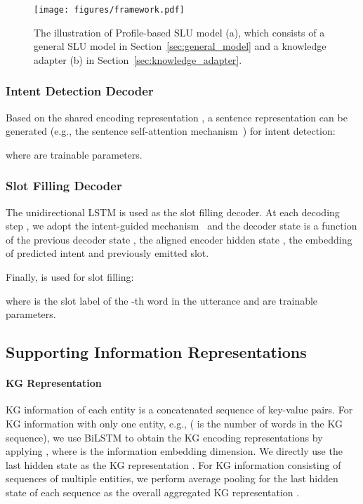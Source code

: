 \documentclass[letterpaper]{article} \usepackage{aaai22}  \usepackage{times}  \usepackage{helvet}  \usepackage{courier}  \usepackage[hyphens]{url}  \usepackage{graphicx} \urlstyle{rm} \def\UrlFont{\rm}  \usepackage{natbib}  \usepackage{caption} \DeclareCaptionStyle{ruled}{labelfont=normalfont,labelsep=colon,strut=off} \frenchspacing  \setlength{\pdfpagewidth}{8.5in}  \setlength{\pdfpageheight}{11in}  \usepackage{algorithm}
\begin{document}
\begin{figure}[t]
	\centering
	\texttt{[image: figures/framework.pdf]}
	\caption{
		The illustration of Profile-based SLU model (a), which consists of a general SLU model in Section~\ref{sec:general_model} and a knowledge adapter (b) in Section~\ref{sec:knowledge_adapter}.
    }
	\label{fig:framework}
\end{figure}

\subsubsection{Intent Detection Decoder}
Based on the shared encoding representation , 
a sentence representation  can be generated (e.g., the sentence self-attention mechanism~\citep{zhong-etal-2018-global}) for intent detection:

where  are trainable parameters. 

\subsubsection{Slot Filling Decoder}
The unidirectional LSTM is used as the slot filling decoder. 
At each decoding step , we adopt the intent-guided mechanism~\citep{qin-etal-2019-stack} and the decoder state  is a function of 
the previous decoder state ,
the aligned encoder hidden state , 
the embedding of predicted intent and previously emitted slot.

Finally,  is used for slot filling:

where  is the slot label of the -th word in the utterance and  are trainable parameters.

\subsection{Supporting Information Representations} 
\paragraph{KG Representation}
KG information of each entity is a concatenated sequence of key-value pairs. 
For KG information with only one entity, 
e.g.,  ( is the number of words in the KG sequence),
we use BiLSTM to obtain the KG encoding representations  by applying , where  is the information embedding dimension.
We directly use the last hidden state  as the KG representation .
For KG information consisting of sequences of multiple entities, we perform average pooling for the last hidden state of each sequence as the overall aggregated KG representation .
\end{document}
